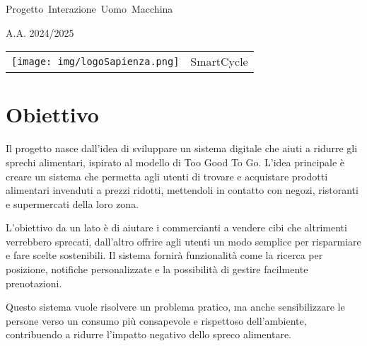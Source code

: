 \documentclass{article}
\author{Alessandro Dori}
\date{\today}
\begin{document}
\hbox{\Huge Progetto Interazione Uomo Macchina}
\begin{center}
    \Huge A.A. 2024/2025
\end{center}

\begin{center}
    \begin{tabular}{c c}
        \texttt{[image: img/logoSapienza.png]} & \huge SmartCycle \\
    \end{tabular}
\end{center}

\section*{Obiettivo}
Il progetto nasce dall'idea di sviluppare un sistema digitale che aiuti a ridurre gli sprechi alimentari, ispirato al modello di Too Good To Go. 
L’idea principale è creare un sistema che permetta agli utenti di trovare e acquistare prodotti alimentari invenduti a prezzi ridotti, mettendoli in contatto con negozi, ristoranti e supermercati della loro zona.

L’obiettivo da un lato è di aiutare i commercianti a vendere cibi che altrimenti verrebbero sprecati, dall’altro offrire agli utenti un modo semplice per risparmiare e fare scelte sostenibili. 
Il sistema fornirà funzionalità come la ricerca per posizione, notifiche personalizzate e la possibilità di gestire facilmente prenotazioni.

Questo sistema vuole risolvere un problema pratico, ma anche sensibilizzare le persone verso un consumo più consapevole e rispettoso dell’ambiente, contribuendo a ridurre l’impatto negativo dello spreco alimentare.
\newpage
\end{document}

